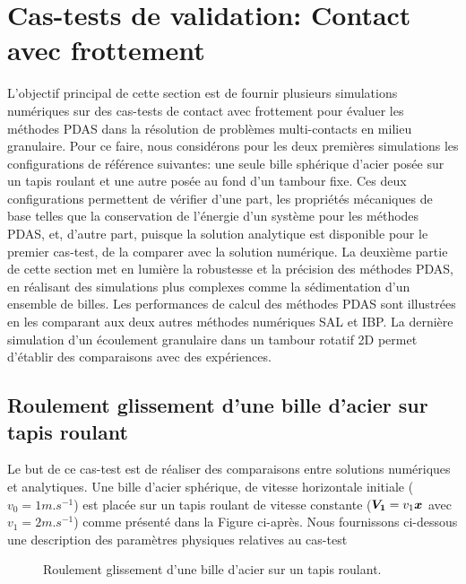 \newpage

\section{Cas-tests de validation: Contact avec frottement}\label{friction_test_cases}

L'objectif principal de cette section est de fournir plusieurs simulations numériques sur des cas-tests de contact avec frottement pour évaluer les méthodes PDAS dans la résolution de problèmes multi-contacts en milieu granulaire. Pour ce faire, nous considérons pour les deux premières simulations les configurations de référence suivantes: une seule bille sphérique d'acier posée sur un tapis roulant et une autre posée au fond d'un tambour fixe. Ces deux configurations permettent de vérifier d'une part, les propriétés mécaniques de base telles que la conservation de l'énergie d'un système pour les méthodes PDAS, et, d'autre part, puisque la solution analytique est disponible pour le premier cas-test, de la comparer avec la solution numérique. La deuxième partie de cette section met en lumière la robustesse et la précision des méthodes PDAS, en réalisant des simulations plus complexes comme la sédimentation d'un ensemble de billes. Les performances de calcul des méthodes PDAS sont illustrées en les comparant aux deux autres méthodes numériques SAL et IBP. La dernière simulation d'un écoulement granulaire dans un tambour rotatif 2D permet d'établir des comparaisons avec des expériences.


\subsection{Roulement glissement d'une bille d'acier sur tapis roulant}\label{ex1}

Le but de ce cas-test est de réaliser des comparaisons entre solutions numériques et analytiques. Une bille d'acier sphérique, de vitesse horizontale initiale ($v_0 = 1m.s^{-1}$) est placée sur un tapis roulant de vitesse constante ($\boldsymbol{V_1} = v_1 \boldsymbol{x}$ avec $v_1 = 2m.s^{-1}$) comme présenté dans la Figure ci-après. Nous fournissons ci-dessous une description des paramètres physiques relatives au cas-test

\begin{figure}[h!]
	\begin{center}
	\end{center}
	\caption{Roulement glissement d'une bille d'acier sur un tapis roulant.}
	\label{conv_belt}
\end{figure}

